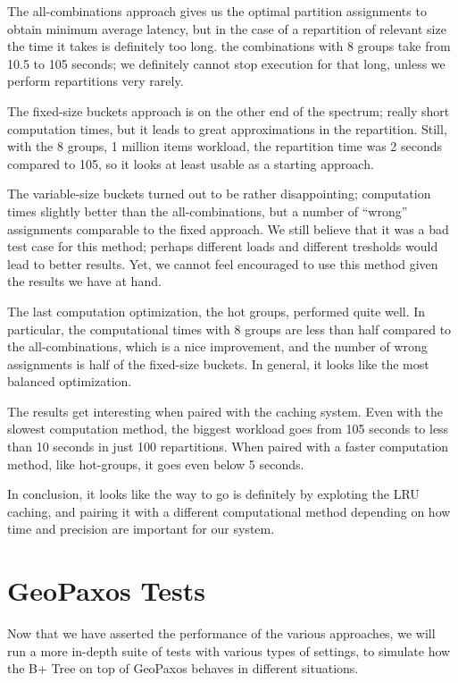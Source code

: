 The all-combinations approach gives us the optimal partition assignments to obtain minimum average latency, but in the case of a repartition of relevant size the time it takes is definitely too long. the combinations with 8 groups take from 10.5 to 105 seconds; we definitely cannot stop execution for that long, unless we perform repartitions very rarely.

The fixed-size buckets approach is on the other end of the spectrum; really short computation times, but it leads to great approximations in the repartition. Still, with the 8 groups, 1 million items workload, the repartition time was 2 seconds compared to 105, so it looks at least usable as a starting approach.

The variable-size buckets turned out to be rather disappointing; computation times slightly better than the all-combinations, but a number of ``wrong'' assignments comparable to the fixed approach. We still believe that it was a bad test case for this method; perhaps different loads and different tresholds would lead to better results. Yet, we cannot feel encouraged to use this method given the results we have at hand.

The last computation optimization, the hot groups, performed quite well. In particular, the computational times with 8 groups are less than half compared to the all-combinations, which is a nice improvement, and the number of wrong assignments is half of the fixed-size buckets. In general, it looks like the most balanced optimization.

The results get interesting when paired with the caching system. Even with the slowest computation method, the biggest workload goes from 105 seconds to less than 10 seconds in just 100 repartitions. When paired with a faster computation method, like hot-groups, it goes even below 5 seconds. 

In conclusion, it looks like the way to go is definitely by exploting the LRU caching, and pairing it with a different computational method depending on how time and precision are important for our system.


\section{GeoPaxos Tests}\label{sec:geopaxos-tests}
Now that we have asserted the performance of the various approaches, we will run a more in-depth suite of tests with various types of settings, to simulate how the B+ Tree on top of GeoPaxos behaves in different situations.
